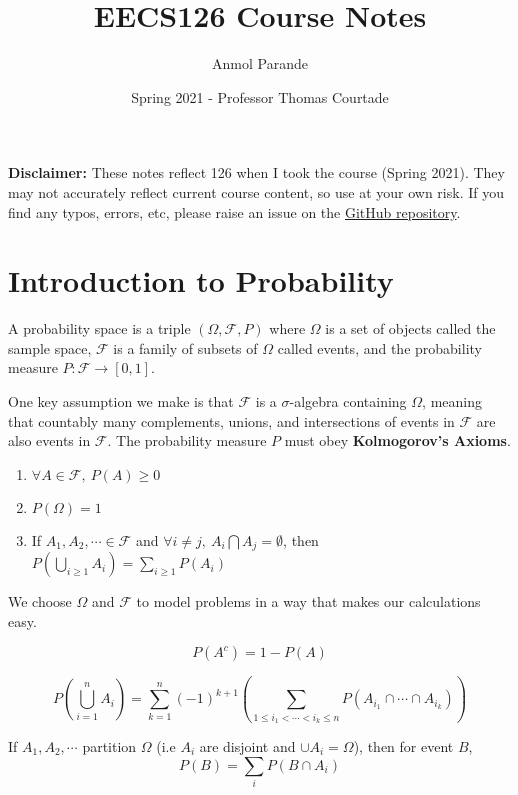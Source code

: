 

\title{EECS126 Course Notes}
\author{Anmol Parande}
\date{Spring 2021 - Professor Thomas Courtade}
\maketitle
\textbf{Disclaimer: }These notes reflect 126 when I took the course (Spring 2021). They may not accurately reflect current course content, so use at your own risk.
If you find any typos, errors, etc, please raise an issue on the \href{https://github.com/parandea17/BerkeleyNotes}{GitHub repository}.
\tableofcontents
\newpage
\section{Introduction to Probability}
\begin{definition}
  A probability space is a triple $(\Omega, \mathcal{F}, P)$ where $\Omega$ is a set of objects called the sample space, $\mathcal{F}$ is a family of subsets of $\Omega$ called events, and the probability measure $P:\mathcal{F}\rightarrow [0,1]$.
  \label{defn:prob-space}
\end{definition}
One key assumption we make is that $\mathcal{F}$ is a $\sigma$-algebra containing $\Omega$, meaning that countably many complements, unions, and intersections of events in $\mathcal{F}$ are also events in $\mathcal{F}$.
The probability measure $P$ must obey \textbf{Kolmogorov's Axioms}.
\begin{enumerate}
  \item $\forall A \in \mathcal{F},\ P(A) \geq 0$
  \item $P(\Omega) = 1$
  \item If $A_1, A_2, \cdots\in \mathcal{F}$ and $\forall i\ne j,\ A_i\bigcap A_j=\emptyset$, then $P\left(\bigcup_{i\geq 1}A_i\right) = \sum_{i\geq1}P(A_i)$
\end{enumerate}
We choose $\Omega$ and $\mathcal{F}$ to model problems in a way that makes our calculations easy.
\begin{theorem}
  \[
	P(A^c) = 1 - P(A)
  \]
  \label{thm:complementarity}
\end{theorem}
\begin{theorem}
  
	\[
	P\left( \bigcup_{i=1}^{n}A_i \right) = \sum_{k=1}^{n}(-1)^{k+1}\left( \sum_{1\leq i_1<\cdots<i_k\leq n} P(A_{i_1}\cap \cdots \cap A_{i_k}) \right)
  \]
  \label{thm:inclusion-exclusion}
\end{theorem}
\begin{theorem}
  If $A_1, A_2, \cdots$ partition $\Omega$ (i.e $A_i$ are disjoint and $\cup A_i = \Omega$), then for event $B$,
  \[
	P(B) = \sum_iP(B\cap A_i)
  \]
  \label{thm:total-prob}
\end{theorem}
